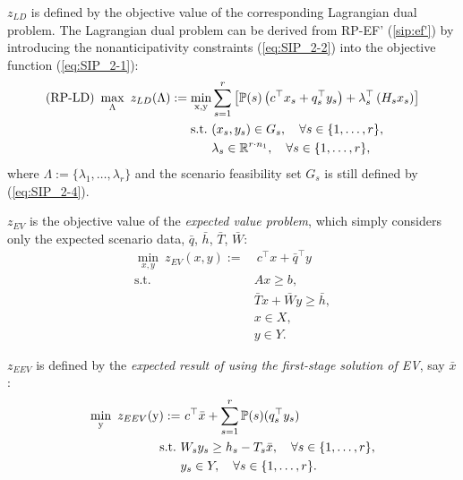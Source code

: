 $z_{LD}$ is defined by the objective value of the corresponding Lagrangian dual problem. The Lagrangian dual problem can be derived from RP-EF' (\ref{sip:ef'}) by introducing the nonanticipativity constraints (\ref{eq:SIP_2-2}) into the objective function (\ref{eq:SIP_2-1}):
\begin{subequations}\label{ld}
	\begin{align}
	\textrm{(RP-LD) }\max_{\Lambda}\ z_{LD}(\Lambda) :=\min_{\mathrm{x},\mathrm{y}}  &\sum_{s=1}^{r}\left[\operatorname*{\mathbb{P}}(s)\left(c^{\top}x_s+q_s^{\top}y_s\right)+\lambda_s^\top \left(H_s x_s\right)\right] \label{ld:obj}\\ 
	\mathrm{s.t.}\ & (x_s,y_s)\in G_s,\quad \forall s\in\{1,\ldots,r\},	 \label{ld:b}\\
	&\lambda_s\in\mathbb{R}^{r\cdot n_1},\quad \forall s\in\{1,\ldots,r\}, \label{ld:c}
	\end{align}
\end{subequations}
where $\Lambda:=\{\lambda_1,\ldots,\lambda_r\}$ and the scenario feasibility set $G_s$ is still defined by (\ref{eq:SIP_2-4}).

$z_{EV}$ is the objective value of the \textit{expected value problem}, which simply considers only the expected scenario data, $\bar{q}$, $\bar{h}$, $\bar{T}$, $\bar{W}$:
\begin{subequations}\label{ev}
	\begin{align}
	\min_{x,y}\ z_{EV}(x,y):=&\ c^{\top}x + \bar{q}^{\top}y \label{ev:obj}\\ 
	\mathrm{s.t.}\ &Ax\ge b,  \label{ev:b}\\
	&\bar{T} x+\bar{W} y\ge \bar{h},  \label{ev:c}\\
	&x\in X,  \label{ev:d}\\
	&y \in Y. \label{ev:e}
	\end{align}
\end{subequations}

$z_{EEV}$ is defined by the \textit{expected result of using the first-stage solution of EV}, say $\bar{x}$: 
\begin{subequations}\label{eev}
	\begin{align}
	\min_{\mathrm{y}}\ z_{EEV}(\mathrm{y}):=&\ c^{\top}\bar{x} + \sum_{s=1}^{r}\operatorname*{\mathbb{P}}(s) (q_s^{\top}y_s) \label{eev:obj}\\ 
	\mathrm{s.t.}\ &W_s y_s\ge h_s-T_s \bar{x},\quad\forall s\in\{1,\ldots,r\}, \label{eev:b}\\
	&y_s \in Y,\quad\forall s\in\{1,\ldots,r\}. \label{eev:c}
	\end{align}
\end{subequations}

